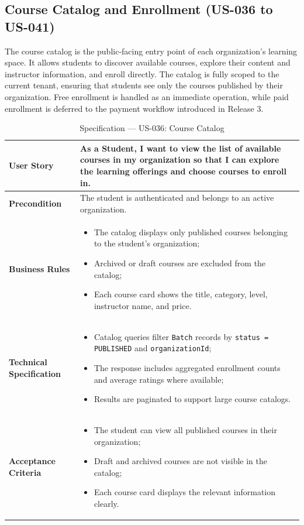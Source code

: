 \subsection{Course Catalog and Enrollment (US-036 to US-041)}

The course catalog is the public-facing entry point of each organization's learning
space. It allows students to discover available courses, explore their content and
instructor information, and enroll directly. The catalog is fully scoped to the current
tenant, ensuring that students see only the courses published by their organization.
Free enrollment is handled as an immediate operation, while paid enrollment is deferred
to the payment workflow introduced in Release 3.

\begin{table}[H]
\centering
\caption{Specification — US-036: Course Catalog}
\label{tab:us036}
\renewcommand{\arraystretch}{1.2}
\begin{tabularx}{\textwidth}{|p{3.5cm}|X|}
\hline
\textbf{User Story} & As a Student, I want to view the list of available courses in my organization so that I can explore the learning offerings and choose courses to enroll in. \\
\hline
\textbf{Precondition} & The student is authenticated and belongs to an active organization. \\
\hline
\textbf{Business Rules} &
\begin{itemize}[noitemsep, topsep=2pt]
  \item The catalog displays only published courses belonging to the student's organization;
  \item Archived or draft courses are excluded from the catalog;
  \item Each course card shows the title, category, level, instructor name, and price.
\end{itemize} \\
\hline
\textbf{Technical Specification} &
\begin{itemize}[noitemsep, topsep=2pt]
  \item Catalog queries filter \texttt{Batch} records by \texttt{status = PUBLISHED} and \texttt{organizationId};
  \item The response includes aggregated enrollment counts and average ratings where available;
  \item Results are paginated to support large course catalogs.
\end{itemize} \\
\hline
\textbf{Acceptance Criteria} &
\begin{itemize}[noitemsep, topsep=2pt]
  \item The student can view all published courses in their organization;
  \item Draft and archived courses are not visible in the catalog;
  \item Each course card displays the relevant information clearly.
\end{itemize} \\
\hline
\end{tabularx}
\end{table}


